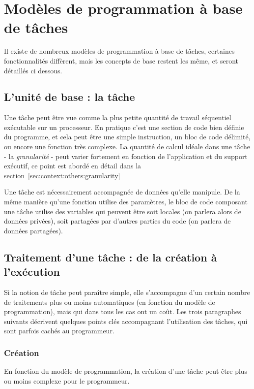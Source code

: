 \section{Modèles de programmation à base de tâches}\label{sec:context:others}

Il existe de nombreux modèles de programmation à base de tâches, certaines fonctionnalités diffèrent, mais les concepts de base restent les même, et seront détaillés ci dessous.

\subsection{L'unité de base : la tâche}

Une tâche peut être vue comme la plus petite quantité de travail séquentiel exécutable sur un processeur.
En pratique c'est une section de code bien définie du programme, et cela peut être une simple instruction, un bloc de code délimité, ou encore une fonction très complexe.
La quantité de calcul idéale dans une tâche - la \emph{granularité} - peut varier fortement en fonction de l'application et du support exécutif, ce point est abordé en détail dans la section~\ref{sec:context:others:granularity}

Une tâche est nécessairement accompagnée de données qu'elle manipule. De la même manière qu'une fonction utilise des paramètres, le bloc de code composant une tâche utilise des variables qui peuvent être soit locales (on parlera alors de données privées), soit partagées par d'autres parties du code (on parlera de données partagées).


\subsection{Traitement d'une tâche : de la création à l'exécution}\label{sec:context:others:costs}

Si la notion de tâche peut paraître simple, elle s'accompagne d'un certain nombre de traitements plus ou moins automatiques (en fonction du modèle de programmation), mais qui dans tous les cas ont un coût.
Les trois paragraphes suivants décrivent quelques points clés accompagnant l'utilisation des tâches, qui sont parfois cachés au programmeur.

\subsubsection{Création}

En fonction du modèle de programmation, la création d'une tâche peut être plus ou moins complexe pour le programmeur.

